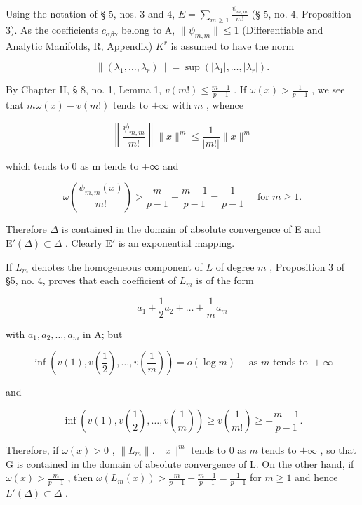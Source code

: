 Using the notation of § 5, nos. 3 and 4, \(E = \sum_{m \geqslant 1} \frac{\psi_{m,m}}{m!}\) (§ 5, no. 4, Proposition 3). As the coefficients \(c_{\alpha\beta\gamma}\) belong to A, \(\|\psi_{m,m}\| \leqslant 1\) (Differentiable and Analytic Manifolds, R, Appendix) \(K^{r}\) is assumed to have the norm

\[
\left\| \left(\lambda_ {1}, \dots , \lambda_ {r}\right) \right\| = \sup \left(\left| \lambda_ {1} \right|, \dots , \left| \lambda_ {r} \right|\right).
\]

By Chapter II, § 8, no. 1, Lemma 1, \(v(m!) \leqslant \frac{m - 1}{p - 1}\) . If \(\omega(x) > \frac{1}{p - 1}\) , we see that \(m\omega(x) - v(m!)\) tends to \(+\infty\) with \(m\) , whence

\[
\left\| \frac {\psi_ {m , m}}{m !} \right\| \| x \| ^ {m} \leqslant \frac {1}{| m ! |} \| x \| ^ {m}
\]

which tends to 0 as m tends to +∞ and

\[
\omega \left(\frac {\psi_ {m , m} (x)}{m !}\right) > \frac {m}{p - 1} - \frac {m - 1}{p - 1} = \frac {1}{p - 1} \quad \text { for } m \geqslant 1.
\]

Therefore \(\Delta\) is contained in the domain of absolute convergence of E and \(\mathrm{E}'(\Delta) \subset \Delta\) . Clearly \(\mathrm{E}'\) is an exponential mapping.

If \(L_{m}\) denotes the homogeneous component of \(L\) of degree \(m\) , Proposition 3 of §5, no. 4, proves that each coefficient of \(L_{m}\) is of the form

\[
a _ {1} + \frac {1}{2} a _ {2} + \dots + \frac {1}{m} a _ {m}
\]

with \(a_1, a_2, \ldots, a_m\) in A; but

\[
\inf \left(v (1), v \left(\frac {1}{2}\right), \dots , v \left(\frac {1}{m}\right)\right) = o (\log m) \quad \text { as   } m \text {   tends   to   } + \infty
\]

and

\[
\inf \left(v (1), v \left(\frac {1}{2}\right), \dots , v \left(\frac {1}{m}\right)\right) \geqslant v \left(\frac {1}{m !}\right) \geqslant - \frac {m - 1}{p - 1}.
\]

Therefore, if \(\omega(x) > 0\) , \(\|L_m\|. \|x\|^m\) tends to 0 as \(m\) tends to \(+\infty\) , so that G is contained in the domain of absolute convergence of L. On the other hand, if \(\omega(x) > \frac{m}{p-1}\) , then \(\omega(L_m(x)) > \frac{m}{p-1} - \frac{m-1}{p-1} = \frac{1}{p-1}\) for \(m \geqslant 1\) and hence \(L'(\Delta) \subset \Delta\) .


